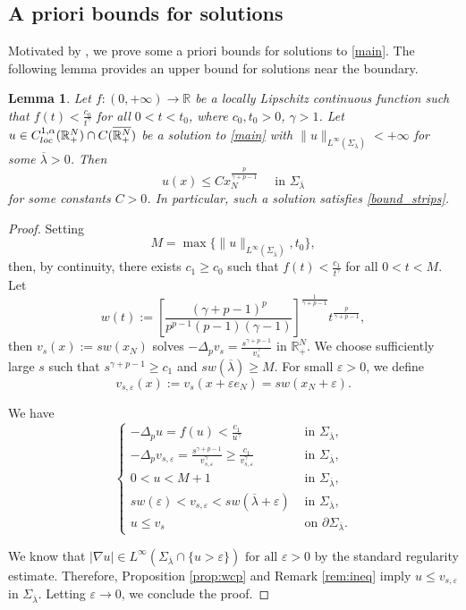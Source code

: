 \documentclass[reqno]{amsart}
\theoremstyle{plain}
\newtheorem{lemma}[theorem]{Lemma}
\theoremstyle{definition}
\theoremstyle{remark}
\begin{document}
	\subsection{A priori bounds for solutions}
	Motivated by \cite{MR4753083}, we prove some a priori bounds for solutions to \eqref{main}.	
	The following lemma provides an upper bound for solutions near the boundary.
	\begin{lemma}\label{lem:upper_bound}
		Let $f:(0,+\infty)\to\mathbb{R}$ be a locally Lipschitz continuous function such that $f(t) < \frac{c_0}{t^\gamma}$ for all $0<t<t_0$, where $c_0,t_0>0$, $\gamma>1$.
		Let $u \in C^{1,\alpha}_{\rm loc}(\mathbb{R}^N_+) \cap C(\overline{\mathbb{R}^N_+})$ be a solution to \eqref{main} with $\|u\|_{L^\infty(\Sigma_{\overline\lambda})} < +\infty$ for some $\overline\lambda>0$. Then
		\[
		u(x) \le C x_N^\frac{p}{\gamma+p-1} \quad\text{ in } \Sigma_{\overline\lambda}
		\]
		for some constants $C>0$. In particular, such a solution satisfies \eqref{bound_strips}.
	\end{lemma}
	\begin{proof}
		Setting
		\[
		M = \max\{\|u\|_{L^\infty(\Sigma_{\overline\lambda})}, t_0\},
		\]
		then, by continuity, there exists $c_1\ge c_0$ such that $f(t) < \frac{c_1}{t^\gamma}$ for all $0<t<M$.
		Let
		\[
		w(t) := \left[\frac{(\gamma+p-1)^p}{p^{p-1}(p-1)(\gamma-1)}\right]^\frac{1}{\gamma+p-1}	t^\frac{p}{\gamma+p-1},
		\]
		then $v_s(x) := s w(x_N)$ solves $-\Delta_p v_s = \frac{s^{\gamma+p-1}}{v_s^\gamma}$ in $\mathbb{R}^N_+$. We choose sufficiently large $s$ such that $s^{\gamma+p-1} \ge c_1$ and $s w(\overline\lambda) \ge M$.		
		For small $\varepsilon>0$, we define
		\[
		v_{s,\varepsilon}(x) := v_s(x + \varepsilon e_N) = s w(x_N + \varepsilon).
		\]
		
		We have
		\[
		\begin{cases}
			-\Delta_p u = f(u) < \frac{c_1}{u^\gamma} & \text{ in } \Sigma_{\overline\lambda},\\
			-\Delta_p v_{s,\varepsilon} = \frac{s^{\gamma+p-1}}{v_{s,\varepsilon}^\gamma} \ge \frac{c_1}{v_{s,\varepsilon}^\gamma} & \text{ in } \Sigma_{\overline\lambda},\\
			0 < u < M + 1 & \text{ in } \Sigma_{\overline\lambda},\\
			s w(\varepsilon) < v_{s,\varepsilon} < s w(\overline\lambda+\varepsilon) & \text{ in } \Sigma_{\overline\lambda},\\
			u \le v_s & \text{ on } \partial\Sigma_{\overline\lambda}.
		\end{cases}
		\]
		
		We know that $|\nabla u| \in L^\infty(\Sigma_{\overline\lambda}\cap\{u>\varepsilon\}) \text{ for all } \varepsilon>0$ by the standard regularity estimate.
		Therefore, Proposition \ref{prop:wcp} and Remark \ref{rem:ineq} imply $u \le v_{s,\varepsilon}$ in $\Sigma_{\overline\lambda}$. Letting $\varepsilon\to0$, we conclude the proof.
	\end{proof}
	
\end{document}
